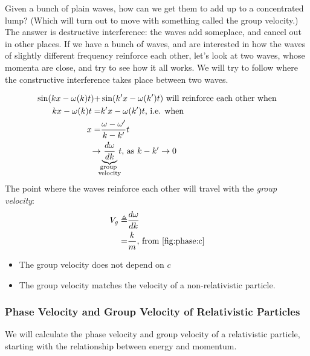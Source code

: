 \documentclass[]{article}
\begin{document}
Given a bunch of plain waves, how can we get them to add up to a concentrated lump? (Which will turn out to move with something called the group velocity.) The answer is destructive interference: the waves add someplace, and cancel out in other places. If we have a bunch of waves, and are interested in how the waves of slightly different frequency reinforce each other, let's look at two waves, whose momenta are close, and try to see how it all works. We will try to follow where the constructive interference takes place between two waves.

\begin{align*}
	\sin(kx-\omega(k)t) +& \sin(k^\prime x-\omega(k^\prime)t)\text{ will reinforce each other when}\\
	kx-\omega(k)t=&k^\prime x-\omega(k^\prime)t\text{, i.e. when}\\
	x =& \frac{\omega-\omega^\prime}{k-k^\prime}t\\
	\rightarrow & \underbrace{\frac{d \omega}{dk}}_{\mathclap{\substack{\text{group  }\\
	\text{velocity}}}} t \text{, as $k-k^\prime \rightarrow 0$}
\end{align*}
The point where the waves reinforce each other will travel with the \emph{group velocity}:
\begin{align*}
	V_g\triangleq&\frac{d \omega}{dk}\\
	=&\frac{k}{m} \text{, from \eqref{fig:phase:c}}
\end{align*}
\begin{itemize}
	\item The group velocity does not depend on $c$
	\item The group velocity matches the velocity of a non-relativistic particle.
\end{itemize}

\subsubsection{Phase Velocity and Group Velocity of Relativistic Particles}

We will calculate the phase velocity and group velocity  of a relativistic particle, starting with the relationship between energy and momentum. 
\end{document}

